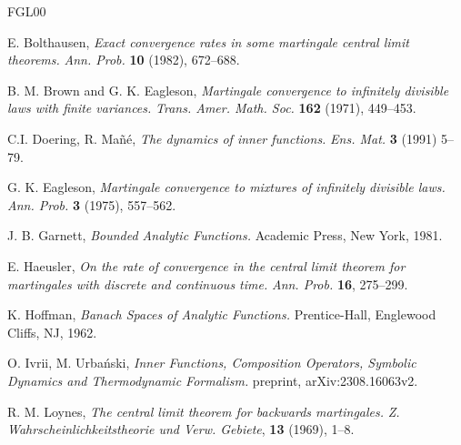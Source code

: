 \documentclass[11pt, reqno]{amsart}
\theoremstyle{definition}
\newtheorem*{Brown-Eagleson Theorem}{The Brown-Eagleson Theorem}
\begin{document}
	
	
	
	
	
	
	
	
	
	
	
	
	
	
	
	
	
	
	
	
	
	
	



\begin{thebibliography}{FGL00}

		E. Bolthausen, \emph{Exact convergence rates in some martingale central limit theorems.} {\sl Ann. Prob.} {\bf 10} (1982), 672--688.
		
		 B. M. Brown and G. K. Eagleson, \emph{Martingale convergence to infinitely divisible laws with finite variances.} {\sl Trans. Amer. Math. Soc.} {\bf 162} (1971), 449--453. 


		C.I. Doering, R. Ma\~n\'e, \emph{The dynamics of inner functions.} {\sl Ens. Mat.} {\bf 3} (1991) 5--79.

		
		 G. K. Eagleson, \emph{Martingale convergence to mixtures of infinitely divisible laws.} {\sl Ann. Prob.} {\bf 3} (1975), 557--562. 

		J. B. Garnett, {\sl Bounded Analytic Functions.} Academic Press, New York, 1981.

		E. Haeusler, \emph{On the rate of convergence in the central limit theorem for martingales with discrete and continuous time.} {\sl Ann. Prob.} {\bf 16}, 275--299.

		K. Hoffman, {\sl Banach Spaces of Analytic Functions.} Prentice-Hall, Englewood Cliffs, NJ, 1962.

		O. Ivrii, M. Urba\'nski, \emph{Inner Functions, Composition Operators, Symbolic Dynamics and Thermodynamic Formalism.} preprint, arXiv:2308.16063v2.

		  R. M. Loynes, \emph{The central limit theorem for backwards martingales.} {\sl Z. Wahrscheinlichkeitstheorie und Verw. Gebiete}, {\bf 13} (1969), 1--8.


\end{thebibliography}
\end{document}
